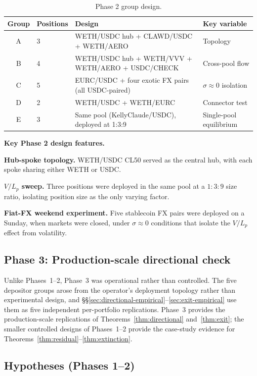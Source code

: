 \documentclass{manuscript}
\begin{document}
\begin{table}[H]
\centering
\caption{Phase 2 group design.}
\label{tab:phase2-groups}
\setlength{\tabcolsep}{4pt}
\begin{tabular}{@{}clL{9.2cm}l@{}}
\toprule
Group & Positions & Design & Key variable \\
\midrule
A & 3 & WETH/USDC hub + CLAWD/USDC + WETH/AERO & Topology \\
B & 4 & WETH/USDC hub + WETH/VVV + WETH/AERO + USDC/CHECK & Cross-pool flow \\
C & 5 & EURC/USDC + four exotic FX pairs (all USDC-paired) & $\sigma \approx 0$ isolation \\
D & 2 & WETH/USDC + WETH/EURC & Connector test \\
E & 3 & Same pool (KellyClaude/USDC), deployed at 1{:}3{:}9 & Single-pool equilibrium \\
\bottomrule
\end{tabular}
\end{table}

\noindent\textbf{Key Phase 2 design features.}

\textbf{Hub-spoke topology.} WETH/USDC CL50 served as the central hub, with each spoke sharing either WETH or USDC.

\textbf{$V/L_p$ sweep.} Three positions were deployed in the same pool at a $1{:}3{:}9$ size ratio, isolating position size as the only varying factor.

\textbf{Fiat-FX weekend experiment.} Five stablecoin FX pairs were deployed on a Sunday, when markets were closed, under $\sigma \approx 0$ conditions that isolate the $V/L_p$ effect from volatility.

\subsection{Phase 3: Production-scale directional check}\label{sec:phase3}

Unlike Phases~1--2, Phase~3 was operational rather than controlled. The five depositor groups arose from the operator's deployment topology rather than experimental design, and \S\S\ref{sec:directional-empirical}--\ref{sec:exit-empirical} use them as five independent per-portfolio replications. Phase~3 provides the production-scale replications of Theorems~\ref{thm:directional} and~\ref{thm:exit}; the smaller controlled designs of Phases~1--2 provide the case-study evidence for Theorems~\ref{thm:residual}--\ref{thm:extinction}.

\subsection{Hypotheses (Phases 1--2)}\label{sec:hypotheses}
\end{document}
